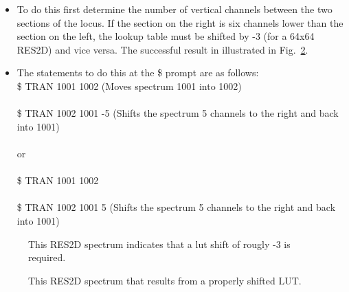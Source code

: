 \documentclass[11pt]{report}
\begin{document}
\begin{itemize}
\item   To do this first determine the number of vertical channels 
between the two sections of the locus. If the section on the right
is six channels lower than the section on the left, the lookup table
must be shifted by -3 (for a 64x64 RES2D) and vice versa. The successful
result in illustrated in Fig.~\ref{fig:res2d}.

\item   The statements to do this at the \$ prompt are as follows: \\

\indent       \$ TRAN 1001 1002 (Moves spectrum 1001 into 1002)\\  
\\ \indent    \$    TRAN 1002 1001 -5 (Shifts the spectrum 5 channels 
to the right and back into 1001)\\ 
\\ \indent        or \\ 
\\ \indent    \$    TRAN 1001 1002 \\ 
\\ \indent    \$    TRAN 1002 1001 5 (Shifts the spectrum 5 channels 
to the right and back into 1001)

\end{itemize}



\begin{figure}[!ht]
\centerline{\vspace{0cm}\hspace{0cm}
}
\centering
\caption{This RES2D spectrum indicates that a lut shift of rougly -3
is required.}
\label{fig:res2d-needshift}
\end{figure} 

\begin{figure}[!ht]
\centerline{\vspace{0cm}\hspace{0cm}
}
\centering
\caption{This RES2D spectrum that results from a properly shifted LUT.}
\label{fig:res2d}
\end{figure} 





\end{document}
